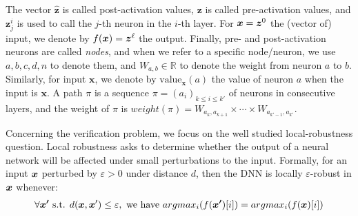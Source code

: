 \documentclass{llncs}
\newcommand{\val}{{\textrm{value}}}
\begin{document}
The vector $\hat{\boldsymbol{z}}$ is called post-activation values, 
$\boldsymbol{z}$ is called pre-activation values, 
and $\boldsymbol{z}^{i}_j$ is used to call the $j$-th neuron in the $i$-th layer. 
For $\boldsymbol{x}={\bm{z}}^0$ the (vector of) input, we denote by $f(\boldsymbol{x})={\bm{z}}^\ell$ the output. Finally, pre- and post-activation neurons are called \emph{nodes}, and when we refer to a specific node/neuron, we use $a,b,c,d,n$ to denote them, and $W_{a,b} \in \mathbb{R}$ to denote the weight from neuron $a$ to $b$. Similarly, for input $\boldsymbol{x}$, we denote by $\val_{\boldsymbol{x}}(a)$ the value of neuron $a$ when the input is $\boldsymbol{x}$. A path $\pi$ is a sequence $\pi=(a_i)_{k \leq  i \leq k'}$ of neurons in consecutive layers, and the weight of $\pi$ is 
$weight(\pi)=W_{a_k,a_{k+1}} \times \cdots \times  W_{a_{k'-1},a_{k'}}$.



\iffalse
and the $i$-th hidden layer is a vector in $\mathbb{R}^{d_i}$, 
and the output layer is a vector in $\mathbb{R}^{d'}$ or a scale. 
The weights, bias and activation functions decide propagate the from previous to the next layer. In formula, from layer $l_{i-1}$ to layer $l_{i}$, the weight 
$\boldsymbol{W}^i$ is matrix of $d_i\times d_{i-1}$, 
the bias is a vector $\vb^i$ in $\mathbb{R}^{d_i}$, and the activation function 
is $\sigma$, then  if the $i-1$-th layer is $\hat{\boldsymbol{z}}^{(i-1)}$, 
then the value of $i$-th layer is computed by: 
\begin{align*}
	{\boldsymbol{z}}^{i} &= \boldsymbol{W}^i\cdot \hat{\boldsymbol{z}}^{(i-1)}+ \vb^i\\
	\hat{\boldsymbol{z}}^{i}(n) &= \sigma({\boldsymbol{z}}^i(n)).
\end{align*} The vector $\hat{\boldsymbol{z}}$ is called post-activation values, and $\boldsymbol{z}$ is called pre-activation values, and $\boldsymbol{z}^{(i)}_j$ is used to call the $j$-th neuron in the $i$-th layer. In our style, we also call neurons \emph{nodes} and use $a,b,c,d$ to denote them. We use $W_{ab}$ to denote the weight from neuron $b$ to $a$. We use $\boldsymbol{x}$ to denote the vector of input and  $f(\boldsymbol{x})$ to denote the output.
\fi

\medskip

Concerning the verification problem, we focus on the well studied local-robustness question. Local robustness asks to determine whether the output of a neural network will be affected under small perturbations to the input. 
Formally, for an input ${\bm{x}}$ perturbed by $\varepsilon >0$ under distance $d$, then the DNN is locally $\varepsilon$-robust in ${\bm{x}}$ whenever:
\begin{align*}
	\forall \boldsymbol{x'} \text{ s.t. } d({\bm{x}},{\bm{x}}')\leq \varepsilon, \text{ we have }  
	argmax_i (f(\boldsymbol{x'})[i]) = argmax_i(f(\boldsymbol{x})[i])
\end{align*} 
\end{document}
